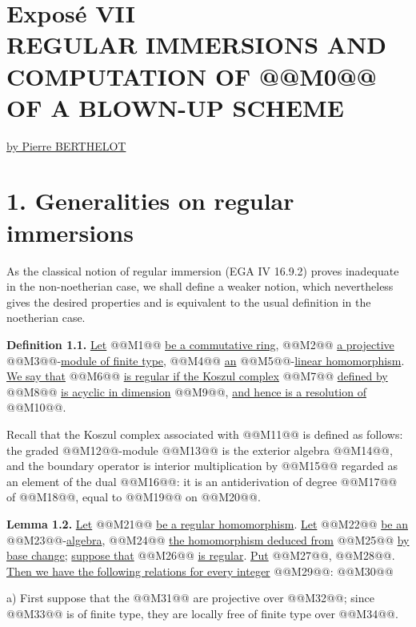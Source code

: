 \renewcommand{\Sym}{\operatorname{Sym}}
\renewcommand{\Projz}{\operatorname{Proj}_0}
\section*{Exposé VII\\[3pt] REGULAR IMMERSIONS AND COMPUTATION OF \texorpdfstring{@@M0@@}{K0} OF A BLOWN-UP SCHEME}
\begin{center}
\uline{by Pierre BERTHELOT}
\end{center}

\section*{1. Generalities on regular immersions}

As the classical notion of regular immersion (EGA IV 16.9.2) proves inadequate in the non-noetherian case, we shall define a weaker notion, which nevertheless gives the desired properties and is equivalent to the usual definition in the noetherian case.

\textbf{Definition 1.1.} \uline{Let} @@M1@@ \uline{be a commutative ring}, @@M2@@ \uline{a projective} @@M3@@-\uline{module of finite type}, @@M4@@ \uline{an} @@M5@@-\uline{linear homomorphism}. \uline{We say that} @@M6@@ \uline{is regular if the Koszul complex} @@M7@@ \uline{defined by} @@M8@@ \uline{is acyclic in dimension} @@M9@@, \uline{and hence is a resolution of} @@M10@@.

Recall that the Koszul complex associated with @@M11@@ is defined as follows: the graded @@M12@@-module @@M13@@ is the exterior algebra @@M14@@, and the boundary operator is interior multiplication by @@M15@@ regarded as an element of the dual @@M16@@: it is an antiderivation of degree @@M17@@ of @@M18@@, equal to @@M19@@ on @@M20@@.

\textbf{Lemma 1.2.} \uline{Let} @@M21@@ \uline{be a regular homomorphism}. \uline{Let} @@M22@@ \uline{be an} @@M23@@-\uline{algebra}, @@M24@@ \uline{the homomorphism deduced from} @@M25@@ \uline{by base change}; \uline{suppose that} @@M26@@ \uline{is regular}. \uline{Put} @@M27@@, @@M28@@. \uline{Then we have the following relations for every integer} @@M29@@:
@@M30@@

a) First suppose that the @@M31@@ are projective over @@M32@@; since @@M33@@ is of finite type, they are locally free of finite type over @@M34@@.
